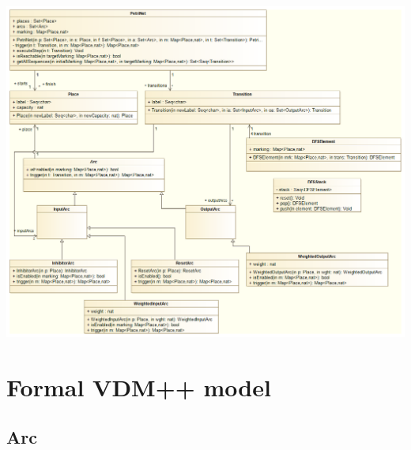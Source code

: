 \documentclass[a4paper]{article}
\begin{document}
\includegraphics[width=17cm]{class_diagram_full.png}

\newpage 

\section {Formal VDM++ model}
\label{sec:formal_model}


\subsection{Arc}


\newpage
\end{document}
